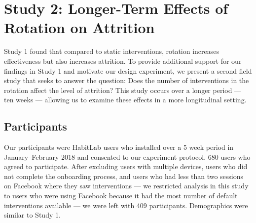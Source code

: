\section{Study 2: Longer-Term Effects of Rotation on Attrition}



Study 1 found that compared to static interventions, rotation increases effectiveness but also increases attrition. To provide additional support for our findings in Study 1 and motivate our design experiment, we present a second field study that seeks to answer the question: Does the number of interventions in the rotation affect the level of attrition? This study occurs over a longer period --- ten weeks --- allowing us to examine these effects in a more longitudinal setting.

\subsection{Participants}


Our participants were HabitLab users who installed over a 5 week period in January--February 2018 and consented to our experiment protocol. 680 users who agreed to participate. After excluding users with multiple devices, users who did not complete the onboarding process, and users who had less than two sessions on Facebook where they saw interventions --- we restricted analysis in this study to users who were using Facebook because it had the most number of default interventions available --- we were left with 409 participants. Demographics were similar to Study 1.

